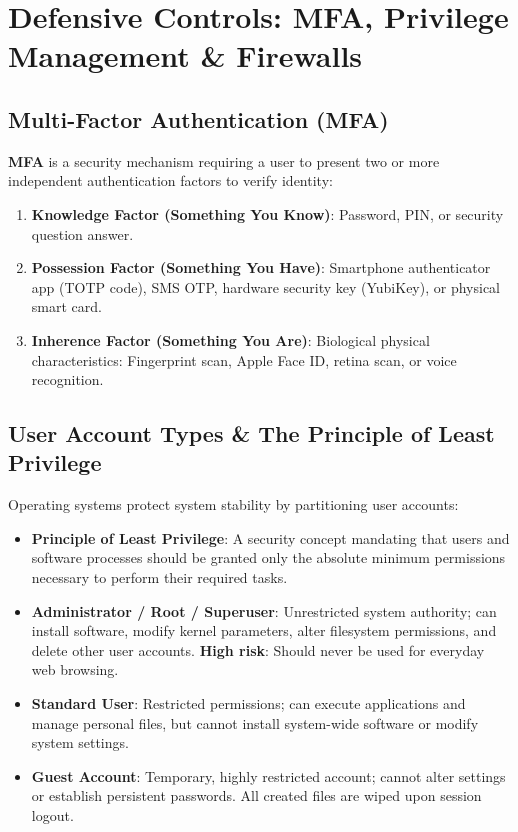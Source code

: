 \section{Defensive Controls: MFA, Privilege Management \& Firewalls}

\subsection{Multi-Factor Authentication (MFA)}

\textbf{MFA} is a security mechanism requiring a user to present two or more independent authentication factors to verify identity:

\begin{keyequation}
\begin{enumerate}[leftmargin=1.5em]
    \item \textbf{Knowledge Factor (Something You Know)}: Password, PIN, or security question answer.
    \item \textbf{Possession Factor (Something You Have)}: Smartphone authenticator app (TOTP code), SMS OTP, hardware security key (YubiKey), or physical smart card.
    \item \textbf{Inherence Factor (Something You Are)}: Biological physical characteristics: Fingerprint scan, Apple Face ID, retina scan, or voice recognition.
\end{enumerate}
\end{keyequation}

\subsection{User Account Types \& The Principle of Least Privilege}

Operating systems protect system stability by partitioning user accounts:
\begin{itemize}[leftmargin=1.5em]
    \item \textbf{Principle of Least Privilege}: A security concept mandating that users and software processes should be granted only the absolute minimum permissions necessary to perform their required tasks.
    \item \textbf{Administrator / Root / Superuser}: Unrestricted system authority; can install software, modify kernel parameters, alter filesystem permissions, and delete other user accounts. \textbf{High risk}: Should never be used for everyday web browsing.
    \item \textbf{Standard User}: Restricted permissions; can execute applications and manage personal files, but cannot install system-wide software or modify system settings.
    \item \textbf{Guest Account}: Temporary, highly restricted account; cannot alter settings or establish persistent passwords. All created files are wiped upon session logout.
\end{itemize}

